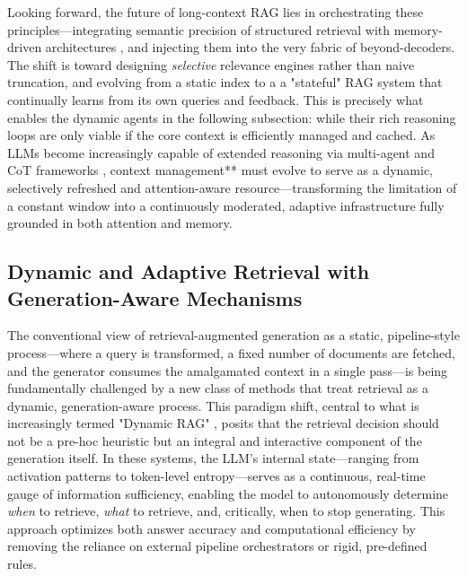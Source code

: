 \documentclass[11pt,a4paper]{article}
\begin{document}
Looking forward, the future of long-context RAG lies in orchestrating these principles---integrating semantic precision of structured retrieval with memory-driven architectures \cite{arxiv:2503.04338v2}, and injecting them into the very fabric of beyond-decoders. The shift is toward designing \emph{selective} relevance engines rather than naive truncation, and evolving from a static index to a a "stateful" RAG system that continually learns from its own queries and feedback. This is precisely what enables the dynamic agents in the following subsection: while their rich reasoning loops are only viable if the core context is efficiently managed and cached. As LLMs become increasingly capable of extended reasoning via multi-agent and CoT frameworks \cite{arxiv:2504.15909v2,arxiv:2507.09477v2}, context management** must evolve to serve as a dynamic, selectively refreshed and attention-aware resource---transforming the limitation of a constant window into a continuously moderated, adaptive infrastructure fully grounded in both attention and memory.


\subsection{Dynamic and Adaptive Retrieval with Generation-Aware Mechanisms}


The conventional view of retrieval-augmented generation as a static, pipeline-style process---where a query is transformed, a fixed number of documents are fetched, and the generator consumes the amalgamated context in a single pass---is being fundamentally challenged by a new class of methods that treat retrieval as a dynamic, generation-aware process. This paradigm shift, central to what is increasingly termed "Dynamic RAG" \cite{arxiv:2506.06704v1}, posits that the retrieval decision should not be a pre-hoc heuristic but an integral and interactive component of the generation itself. In these systems, the LLM's internal state---ranging from activation patterns to token-level entropy---serves as a continuous, real-time gauge of information sufficiency, enabling the model to autonomously determine \emph{when} to retrieve, \emph{what} to retrieve, and, critically, when to stop generating. This approach optimizes both answer accuracy and computational efficiency by removing the reliance on external pipeline orchestrators or rigid, pre-defined rules.
\end{document}
